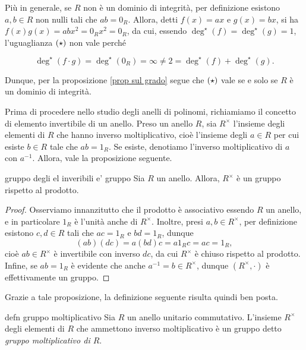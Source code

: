 \noindent Più in generale, se $R$ non è un dominio di integrità, per definizione esistono $a,b\in R$ non nulli 
tali che $ab=0_R$. Allora, detti $f(x)=ax$ e $g(x)=bx$, si ha $f(x)g(x)=abx^2=0_Rx^2=0_R$, da cui, essendo 
$\deg^{\star}(f)=\deg^{\star}(g)=1$, l'uguaglianza $\bf{(\star)}$ non vale perché 

\[\deg^{\star}(f\cdot g)=\deg^{\star}(0_R)=\infty\neq 2=\deg^{\star}(f)+\deg^{\star}(g).\] 

\noindent Dunque, per la proposizione \ref{prop sul grado} segue che $\bf{(\star)}$ vale se e solo se $R$ è un dominio di integrità.
\vspace{1.5mm}

\noindent Prima di procedere nello studio degli anelli di polinomi, richiamiamo il concetto di elemento invertibile di un anello. 
Preso un anello $R$, sia $R^{\times}$ l'insieme degli elementi di $R$ che hanno inverso moltiplicativo, 
cioè l'insieme degli $a\in R$ per cui esiste $b\in R$ tale che $ab=1_R$. Se esiste, denotiamo l'inverso moltiplicativo 
di $a$ con $a^{-1}$. Allora, vale la proposizione seguente.

\begin{prop}[]{gruppo degli el inveribili e' gruppo}
Sia $R$ un anello. Allora, $R^{\times}$ è un gruppo rispetto al prodotto.
\end{prop}
\vspace{-4mm}
\begin{proof}
Osserviamo innanzitutto che il prodotto è associativo essendo $R$ un anello, e in particolare $1_R$ è l'unità anche di 
$R^{\times}$. Inoltre, presi $a,b\in R^{\times}$, per definizione esistono $c,d\in R$ tali che $ac=1_R$ e $bd=1_R$, 
dunque \[(ab)(dc)=a(bd)c=a1_Rc=ac=1_R,\] cioè $ab\in R^{\times}$ è invertibile con inverso $dc$, da cui $R^{\times}$ 
è chiuso rispetto al prodotto. Infine, se $ab=1_R$ è evidente che anche $a^{-1}=b\in R^{\times}$, 
dunque $(R^{\times},\cdot)$ è effettivamente un gruppo.
\end{proof}

\noindent Grazie a tale proposizione, la definizione seguente risulta quindi ben posta.

\begin{defn}{defn gruppo moltiplicativo}
Sia $R$ un anello unitario commutativo. L'insieme $R^{\times}$ degli elementi di $R$ 
che ammettono inverso moltiplicativo è un gruppo detto 
\emph{gruppo moltiplicativo di $R$}.\footnotemark
\end{defn}


